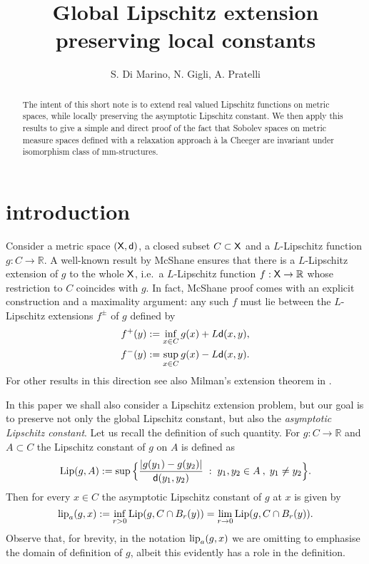 \documentclass[9pt,reqno]{amsart}
\newcommand{\R}{\mathbb{R}}
\newcommand{\sfd}{{\sf d}}
\newcommand{\X}{{\sf X}}
\def\lipa#1#2{{\rm lip}_a (#1,#2)}
\begin{document}
\author{S. Di Marino, N. Gigli, A. Pratelli}
\address{Simone Di Marino, Universit\`a di Genova, Dipartimento di Matematica,  via Dodecaneso 35, 16146 Genova (GE), Italy}
\address{Nicola Gigli, SISSA, Via Bonomea 265, 34136 Trieste (TS), Italy}
\address{Aldo Pratelli, Universit\`a di Pisa, Dipartimento di Matematica, Largo Bruno Pontecorvo 5, 56127 Pisa (PI), Italy} 
\title{Global Lipschitz extension preserving local constants}
\date{}
\begin{abstract}
\noindent
The intent of this short note is to extend real valued Lipschitz functions on metric spaces, while locally preserving the asymptotic Lipschitz constant. We then apply this results to give a simple and direct proof of the fact that Sobolev spaces on metric measure spaces defined with a relaxation approach \`a la Cheeger are invariant under isomorphism class of mm-structures. 
\end{abstract}
\maketitle

\section{introduction}

Consider a metric space $(\X,\sfd)$, a closed subset $C\subset\X$ and a $L$-Lipschitz function $g:C\to\R$. A well-known result by McShane \cite{McShane} ensures that there is a $L$-Lipschitz extension of $g$ to the whole $\X$, i.e.\ a $L$-Lipschitz function $f:\X\to\R$ whose restriction to $C$ coincides with $g$. In fact, McShane proof comes with an explicit construction and a maximality argument: any such $f$ must lie between the  $L$-Lipschitz extensions  $f^\pm$ of $g$ defined by
\[
\begin{split}
f^+(y)&:=\inf_{x\in C}g(x)+L\sfd(x,y),\\
f^-(y)&:=\sup_{x\in C}g(x)-L\sfd(x,y).
\end{split}
\]
For other results in this direction see also Milman's extension theorem in \cite{Milman98}.

\bigskip

In this paper we shall also consider a Lipschitz extension problem, but our goal is to preserve  not only  the global Lipschitz constant, but also the \emph{asymptotic Lipschitz constant}. Let us recall the definition of such quantity. For $g:C\to\R$ and $A\subset C$ the Lipschitz constant of $g$ on $A$ is defined as
\[
{\rm Lip} (g,A): = \sup \Big\{ \frac {|g(y_1)-g(y_2)|}{\sfd(y_1,y_2)} \; : \;  y_1,y_2 \in A\: , \;y_1 \neq y_2 \Big\}.
\]
Then for every $x\in C$ the asymptotic Lipschitz constant of $g$ at $x$ is given by
\[
\lipa{g}{x}:=\inf_{r > 0} {\rm Lip} ( g, C\cap B_r(y))=\lim_{r \to 0} {\rm Lip} ( g, C\cap B_r(y)).
\]
Observe that, for brevity, in the notation $\lipa{g}{x}$ we are omitting to emphasise the domain of definition of $g$, albeit this evidently has a role in the definition.
\end{document}
